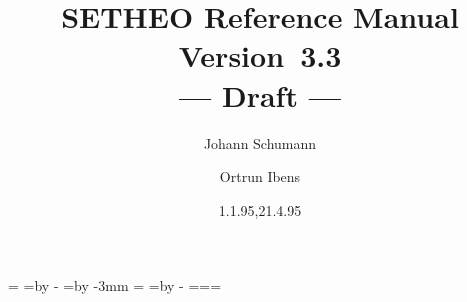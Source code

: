\pagestyle{fancyplain}
\setlength{\headwidth}{16.5cm} 
\renewcommand{\chaptermark}[1]{\markboth{#1}{#1}} %
\renewcommand{\sectionmark}[1]{\markright{\thesection\ #1}}
\lhead[\fancyplain{}{\bf\thepage}]{\fancyplain{}{\bf\rightmark}}
\rhead[\fancyplain{}{\bf\leftmark}]{\fancyplain{}{\bf\thepage}}
\cfoot{}
 


     
     



\newdimen\templength
\def\setleftmarginwidth#1{\templength=#1\relax
    \leftmarginwidth=\templength
    \textwidth=\fullwidth \advance\textwidth by -\templength
    \oddsidemargin=\leftmarginwidth \advance\oddsidemargin by -3mm
    \evensidemargin=\oddsidemargin
    \marginparwidth=\leftmarginwidth \advance\marginparwidth by -\marginparsep
    \hsize=\textwidth \linewidth=\textwidth \columnwidth=\textwidth }
\setleftmarginwidth{1.2cm}



     
\title{SETHEO Reference Manual\\
Version~3.3\\
--- Draft ---}

\author{Johann Schumann \and Ortrun Ibens}

\date{{\tiny 1.1.95},21.4.95}

%
%
%
\def\SAM{{\sc S\kern-.13em\lower.45ex\hbox{A}\kern-.13emM}}
\def\SETHEO{{\sc SETHEO}}
%
\newcommand{\en}{\enspace}
\newcommand{\SE}{SETHEO}
\newcommand{\Se}{{\bf Setheo}}
\newcommand{\se}{{\bf setheo}}
\newcommand{\Xs}{{\bf Xsetheo}}
\newcommand{\xs}{{\bf xsetheo}}
\newcommand{\Sam}{{\bf Sam}}
\newcommand{\sam}{{\bf sam}}
\newcommand{\Wasm}{{\bf Wasm}}
\newcommand{\wasm}{{\bf wasm}}
\newcommand{\Inw}{{\bf Inwasm}}
\newcommand{\inw}{{\bf inwasm}}
\newcommand{\LOP}{LOP}
\newcommand{\Plop}{{\bf Plop}}
\newcommand{\plop}{{\bf plop}}
\newcommand{\Clop}{{\bf Clop}}
\newcommand{\clop}{{\bf clop}}
\newcommand{\Xp}{{\bf Xptree}}
\newcommand{\xp}{{\bf xptree}}
\newcommand{\lb}{{\boldmath $[$}}
\newcommand{\rb}{{\boldmath $]$}}
\newcommand{\Cv}{{\bf {\boldmath $\langle$}Ctrl{\boldmath $\rangle$}--v}}
\newcommand{\Cc}{{\bf {\boldmath $\langle$}Ctrl{\boldmath $\rangle$}--c}}
\newcommand{\qm}{{\bf {\boldmath $\langle$}?{\boldmath $\rangle$}}}

